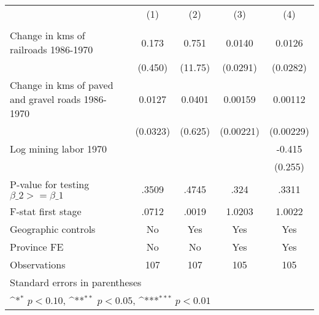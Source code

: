 {
\def\sym#1{\ifmmode^{#1}\else\(^{#1}\)\fi}
\begin{tabular}{l*{4}{c}}
\hline\hline
                &\multicolumn{1}{c}{(1)}&\multicolumn{1}{c}{(2)}&\multicolumn{1}{c}{(3)}&\multicolumn{1}{c}{(4)}\\
                &\multicolumn{1}{c}{}&\multicolumn{1}{c}{}&\multicolumn{1}{c}{}&\multicolumn{1}{c}{}\\
\hline
Change in kms of railroads 1986-1970&    0.173         &    0.751         &   0.0140         &   0.0126         \\
                &  (0.450)         &  (11.75)         & (0.0291)         & (0.0282)         \\
[1em]
Change in kms of paved and gravel roads 1986-1970&   0.0127         &   0.0401         &  0.00159         &  0.00112         \\
                & (0.0323)         &  (0.625)         &(0.00221)         &(0.00229)         \\
[1em]
Log mining labor 1970&                  &                  &                  &   -0.415         \\
                &                  &                  &                  &  (0.255)         \\
\hline
P-value for testing $\beta\_{2} >= \beta\_{1}$&    .3509         &    .4745         &     .324         &    .3311         \\
F-stat first stage&    .0712         &    .0019         &   1.0203         &   1.0022         \\
Geographic controls&       No         &      Yes         &      Yes         &      Yes         \\
Province FE     &       No         &       No         &      Yes         &      Yes         \\
Observations    &      107         &      107         &      105         &      105         \\
\hline\hline
\multicolumn{5}{l}{\footnotesize Standard errors in parentheses}\\
\multicolumn{5}{l}{\footnotesize \sym{*} \(p<0.10\), \sym{**} \(p<0.05\), \sym{***} \(p<0.01\)}\\
\end{tabular}
}
